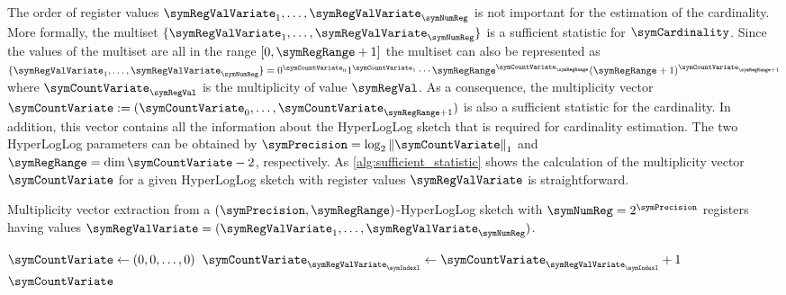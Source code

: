 \documentclass[a4paper]{scrartcl}
\newcommand{\comm}[2]{{\Comment{\parbox[t]{#1\linewidth}{{#2}}}}}
\begin{document}
The order of register values $\symRegValVariate_1,\ldots,\symRegValVariate_\symNumReg$ is not important for the estimation of the cardinality. More formally, the multiset $\lbrace\symRegValVariate_1,\ldots,\symRegValVariate_\symNumReg\rbrace$ is a sufficient statistic for $\symCardinality$.
Since the values of the multiset are all in the range $[0, \symRegRange+1]$ the multiset can also be represented as $\lbrace\symRegValVariate_1,\ldots,\symRegValVariate_\symNumReg\rbrace = 0^{\symCountVariate_0}1^{\symCountVariate_1}\cdots\symRegRange^{\symCountVariate_{\symRegRange}}(\symRegRange+1)^{\symCountVariate_{\symRegRange+1}}$ where $\symCountVariate_\symRegVal$ is the multiplicity of value $\symRegVal$. As a consequence, the multiplicity vector $\boldsymbol{\symCountVariate} := (\symCountVariate_0,\ldots,\symCountVariate_{\symRegRange+1})$ is also a sufficient statistic for the cardinality. In addition, this vector contains all the information about the HyperLogLog sketch that is required for cardinality estimation. The two HyperLogLog parameters can be obtained by $\symPrecision = \log_2 \left\Vert\boldsymbol{\symCountVariate}\right\Vert_1$ and $\symRegRange=\dim\boldsymbol{\symCountVariate}-2$, respectively. As \cref{alg:sufficient_statistic} shows the calculation of the multiplicity vector $\boldsymbol{\symCountVariate}$ for a given HyperLogLog sketch with register values $\boldsymbol{\symRegValVariate}$ is straightforward.

\begin{algorithm}
\caption{Multiplicity vector extraction from a $(\symPrecision, \symRegRange)$-HyperLogLog sketch with $\symNumReg=2^\symPrecision$ registers having values $\boldsymbol{\symRegValVariate} = (\symRegValVariate_1,\ldots,\symRegValVariate_\symNumReg)$.} 
\label{alg:sufficient_statistic}
\begin{algorithmic}
\comm{.4}{$\boldsymbol{\symRegValVariate}\in\lbrace 0,1,\ldots,\symRegRange+1\rbrace^\symNumReg$}
\State $\boldsymbol{\symCountVariate}\gets \left(0,0,\ldots, 0\right)$
\comm{.4}{$\boldsymbol{\symCountVariate} = (\symCountVariate_0,\ldots,\symCountVariate_{\symRegRange+1})$}
\State $\symCountVariate_{\symRegValVariate_\symIndexI} \gets \symCountVariate_{\symRegValVariate_\symIndexI} + 1$
\EndFor
\State \Return $\boldsymbol{\symCountVariate}$
\EndFunction
\end{algorithmic}
\end{algorithm}
\end{document}
